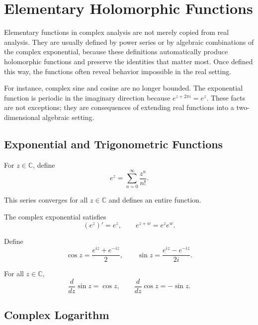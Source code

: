 \section{Elementary Holomorphic Functions}


Elementary functions in complex analysis are not merely copied from real analysis. They are usually defined by power series or by algebraic combinations of the complex exponential, because these definitions automatically produce holomorphic functions and preserve the identities that matter most. Once defined this way, the functions often reveal behavior impossible in the real setting.

For instance, complex sine and cosine are no longer bounded. The exponential function is periodic in the imaginary direction because $e^{z+2\pi i}=e^z$. These facts are not exceptions; they are consequences of extending real functions into a two-dimensional algebraic setting.

\subsection{Exponential and Trigonometric Functions}

\begin{definition}
For $z\in\mathbb{C}$, define
\[
    e^z=\sum_{n=0}^{\infty}\frac{z^n}{n!}.
\]
\end{definition}

This series converges for all $z\in\mathbb{C}$ and defines an entire function.

\begin{proposition}
The complex exponential satisfies
\[
    (e^z)'=e^z,
    \qquad
    e^{z+w}=e^ze^w.
\]
\end{proposition}

\begin{definition}
Define
\[
    \cos z=\frac{e^{iz}+e^{-iz}}{2},
    \qquad
    \sin z=\frac{e^{iz}-e^{-iz}}{2i}.
\]
\end{definition}

\begin{proposition}
For all $z\in\mathbb{C}$,
\[
    \frac{d}{dz}\sin z=\cos z,
    \qquad
    \frac{d}{dz}\cos z=-\sin z.
\]
\end{proposition}

\subsection{Complex Logarithm}


